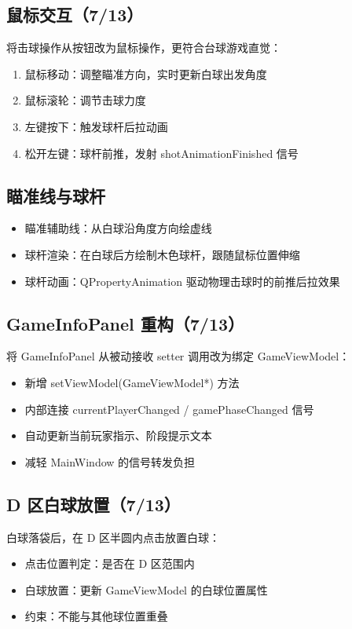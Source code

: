 \documentclass[11pt]{ctexart}
\begin{document}
\subsection{鼠标交互（7/13）}

将击球操作从按钮改为鼠标操作，更符合台球游戏直觉：

\begin{enumerate}[leftmargin=*]
\item 鼠标移动：调整瞄准方向，实时更新白球出发角度
\item 鼠标滚轮：调节击球力度
\item 左键按下：触发球杆后拉动画
\item 松开左键：球杆前推，发射 shotAnimationFinished 信号
\end{enumerate}

\subsection{瞄准线与球杆}

\begin{itemize}
\item 瞄准辅助线：从白球沿角度方向绘虚线
\item 球杆渲染：在白球后方绘制木色球杆，跟随鼠标位置伸缩
\item 球杆动画：QPropertyAnimation 驱动物理击球时的前推后拉效果
\end{itemize}

\subsection{GameInfoPanel 重构（7/13）}

将 GameInfoPanel 从被动接收 setter 调用改为绑定 GameViewModel：

\begin{itemize}
\item 新增 setViewModel(GameViewModel*) 方法
\item 内部连接 currentPlayerChanged / gamePhaseChanged 信号
\item 自动更新当前玩家指示、阶段提示文本
\item 减轻 MainWindow 的信号转发负担
\end{itemize}

\subsection{D 区白球放置（7/13）}

白球落袋后，在 D 区半圆内点击放置白球：
\begin{itemize}
\item 点击位置判定：是否在 D 区范围内
\item 白球放置：更新 GameViewModel 的白球位置属性
\item 约束：不能与其他球位置重叠
\end{itemize}
\end{document}
